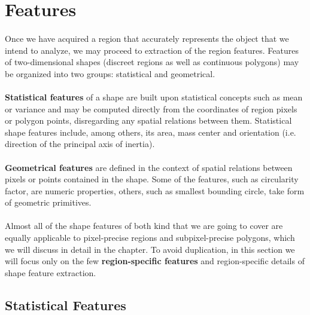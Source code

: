 \section{Features}

\paragraph*{}
Once we have acquired a region that accurately represents the object that we intend to analyze, we may proceed to extraction of the region features. Features of two-dimensional shapes (discreet regions as well as continuous polygons) may be organized into two groups: statistical and geometrical.

\paragraph*{}
\textbf{Statistical features} of a shape are built upon statistical concepts such as mean or variance and may be computed directly from the coordinates of region pixels or polygon points, disregarding any spatial relations between them. Statistical shape features include, among others, its area, mass center and orientation (i.e. direction of the principal axis of inertia).

\paragraph*{}
\textbf{Geometrical features} are defined in the context of spatial relations between pixels or points contained in the shape. Some of the features, such as circularity factor, are numeric properties, others, such as smallest bounding circle, take form of geometric primitives.

\paragraph*{}
Almost all of the shape features of both kind that we are going to cover are equally applicable to pixel-precise regions and subpixel-precise polygons, which we will discuss in detail in the  chapter. To avoid duplication, in this section we will focus only on the few \textbf{region-specific features} and region-specific details of shape feature extraction.

\subsection{Statistical Features}

